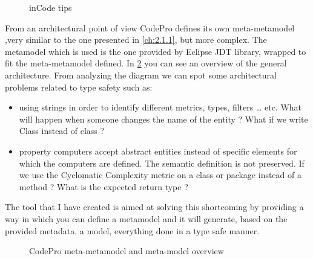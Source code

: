 \begin{figure}
\centering
{}
\caption{inCode tips \cite{tools:inCode} \label{fig:inCodeTips}}
\end{figure}


	From an architectural point of view CodePro defines its own meta-metamodel 
,very similar to the one presented in \ref{ch:2.1.1}, but more complex. The
metamodel which is used is the one provided by Eclipse JDT library, wrapped to fit the
meta-metamodel defined. In \ref{fig:codeProUML} you can see an overview of the
general architecture. From analyzing the diagram we can spot some architectural 
problems related to type safety such as:
	\begin{itemize}
	  \item using strings in order to identify different metrics, types, filters 
 \ldots{} etc.  What will happen when someone changes the name of the entity ? 
 What if we write Class instead of class ? \\
	 
	  \item property computers accept abstract entities instead of specific 
elements for which the computers are defined. The semantic definition is not 
preserved. If we use the Cyclomatic Complexity metric on a class or package  
instead of a method ? What is the expected return type ? \\

	\end{itemize}
	The tool that I have created is aimed at solving this shortcoming by providing
a way in which you can define a metamodel and it will generate, based on the
provided metadata, a model, everything done in a type safe manner.

\begin{figure}
\centering
{}
\caption{CodePro meta-metamodel and meta-model overview}
\label{fig:codeProUML}
\end{figure}



